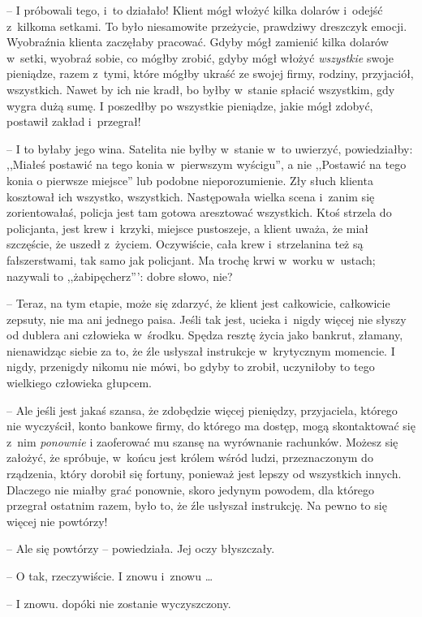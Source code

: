 \documentclass[oneside,polish,11pt,rmheadings]{mwbk}
\begin{document}
-- I próbowali tego, i~to działało! Klient mógł włożyć kilka dolarów i~odejść z~kilkoma setkami. To było niesamowite przeżycie, prawdziwy dreszczyk emocji. Wyobraźnia klienta zaczęłaby pracować. Gdyby mógł zamienić kilka dolarów w~setki, wyobraź sobie, co mógłby zrobić, gdyby mógł włożyć \textit{wszystkie }swoje pieniądze, razem z~tymi, które mógłby ukraść ze swojej firmy, rodziny, przyjaciół, wszystkich. Nawet by ich nie kradł, bo byłby w~stanie spłacić wszystkim, gdy wygra dużą sumę. I poszedłby po wszystkie pieniądze, jakie mógł zdobyć, postawił zakład i~przegrał!

-- I to byłaby jego wina. Satelita nie byłby w~stanie w~to uwierzyć, powiedziałby: ,,Miałeś postawić na tego konia w~pierwszym wyścigu'', a nie ,,Postawić na tego konia o pierwsze miejsce'' lub podobne nieporozumienie. Zły słuch klienta kosztował ich wszystko, wszystkich. Następowała wielka scena i~zanim się zorientowałaś, policja jest tam gotowa aresztować wszystkich. Ktoś strzela do policjanta, jest krew i~krzyki, miejsce pustoszeje, a klient uważa, że miał szczęście, że uszedł z~życiem. Oczywiście, cała krew i~strzelanina też są fałszerstwami, tak samo jak policjant. Ma trochę krwi w~worku w~ustach; nazywali to ,,żabipęcherz''': dobre słowo, nie?

-- Teraz, na tym etapie, może się zdarzyć, że klient jest całkowicie, całkowicie zepsuty, nie ma ani jednego paisa. Jeśli tak jest, ucieka i~nigdy więcej nie słyszy od dublera ani człowieka w~środku. Spędza resztę życia jako bankrut, złamany, nienawidząc siebie za to, że źle usłyszał instrukcje w~krytycznym momencie. I nigdy, przenigdy nikomu nie mówi, bo gdyby to zrobił, uczyniłoby to tego wielkiego człowieka głupcem.

-- Ale jeśli jest jakaś szansa, że zdobędzie więcej pieniędzy, przyjaciela, którego nie wyczyścił, konto bankowe firmy, do którego ma dostęp, mogą skontaktować się z~nim \textit{ponownie }i zaoferować mu szansę na wyrównanie rachunków. Możesz się założyć, że spróbuje, w~końcu jest królem wśród ludzi, przeznaczonym do rządzenia, który dorobił się fortuny, ponieważ jest lepszy od wszystkich innych. Dlaczego nie miałby grać ponownie, skoro jedynym powodem, dla którego przegrał ostatnim razem, było to, że źle usłyszał instrukcję. Na pewno to się więcej nie powtórzy!

-- Ale się powtórzy -- powiedziała. Jej oczy błyszczały.

-- O tak, rzeczywiście. I znowu i~znowu \ldots 

-- I znowu. dopóki nie zostanie wyczyszczony.
\end{document}
